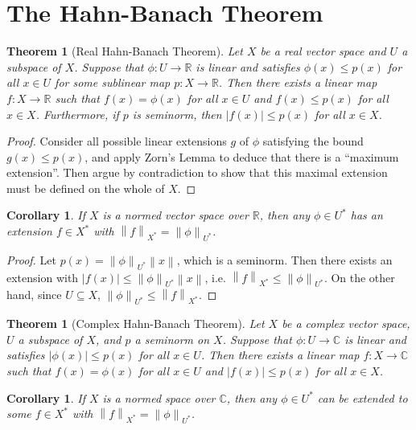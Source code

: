 \documentclass[12pt,a4paper]{report}
\numberwithin{equation}{section}
\theoremstyle{mystyle}
\newtheorem{theorem}[definition]{Theorem}
\newtheorem{corollary}[definition]{Corollary}
\newcommand{\R}{\mathbb{R}}
\newcommand{\C}{\mathbb{C}}
\newcommand{\norm}[1]{\left\lVert #1 \right\rVert}
\begin{document}
	\section{The Hahn-Banach Theorem}
	\begin{theorem}[Real Hahn-Banach Theorem]\label{thm:Hahn-Banach}
		Let $X$ be a real vector space and $U$ a subspace of $X$. Suppose that $\phi: U\to\R$ is linear and satisfies 
		$\phi(x)\leq p(x)$ for all $x\in U$ for some sublinear map $p:X\to \R$. Then there exists a linear map $f:X\to\R$ such that $f(x)=\phi(x)$ for all $x\in U$ and $f(x)\leq p(x)$ for all $x\in X$. Furthermore, if $p$ is seminorm, then $|f(x)|\leq p(x)$ for all $x\in X$.
	\end{theorem}
	\begin{proof}
		Consider all possible linear extensions $g$ of $\phi$ satisfying the bound $g(x)\leq p(x)$, and apply Zorn's Lemma to deduce that there is a ``maximum extension''. Then argue by contradiction to show that this maximal extension must be defined on the whole of $X$.
	\end{proof}
	\begin{corollary}
		If $X$ is a normed vector space over $\R$, then any $\phi\in U^*$ has an extension $f\in X^*$ with $\norm{f}_{X^*}=\norm{\phi}_{U^*}$.
	\end{corollary}
	\begin{proof}
		Let $p(x)=\norm{\phi}_{U^*}\norm{x}$, which is a seminorm. Then there exists an extension with $|f(x)|\leq \norm{\phi}_{U^*}\norm{x}$, i.e. $\norm{f}_{X^*}\leq \norm{\phi}_{U^*}$. On the other hand, since $U\subseteq X$, $\norm{\phi}_{U^*}\leq \norm{f}_{X^*}$.
	\end{proof}
	
	\begin{theorem}[Complex Hahn-Banach Theorem]
		Let $X$ be a complex vector space, $U$ a subspace of $X$, and $p$ a seminorm on $X$. Suppose that $\phi:U\to \C$ is linear and satisfies $|\phi(x)|\leq p(x)$ for all $x\in U$. Then there exists a linear map $f:X\to \C$ such that $f(x)=\phi(x)$ for all $x\in U$ and $|f(x)|\leq p(x)$ for all $x\in X$.
	\end{theorem}
	
	\begin{corollary}
		If $X$ is a normed space over $\C$, then any $\phi\in U^*$ can be extended to some $f\in X^*$ with $\norm{f}_{X^*}=\norm{\phi}_{U^*}$.
	\end{corollary}
\end{document}
